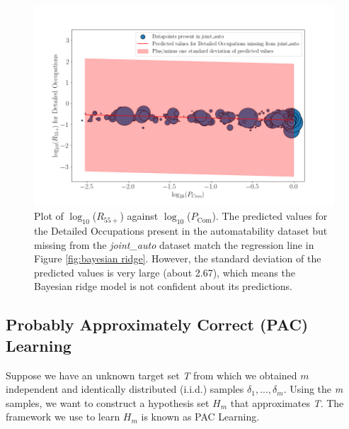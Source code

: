 \documentclass[11pt]{article}
\begin{document}
\begin{figure}[!htb]
	\centering
	\includegraphics[width=15cm]{Figures/Bayesian predicted2.png}
	\caption{Plot of $\log_{10}$($R_{55+}$) against $\log_{10}$($P_{\text{Com}}$). The predicted values for the Detailed Occupations present in the automatability dataset but missing from the \emph{joint\_auto} dataset match the regression line in Figure \ref{fig:bayesian ridge}. However, the standard deviation of the predicted values is very large (about 2.67), which means the Bayesian ridge model is not confident about its predictions.}
	\label{fig:baysian predicted}
\end{figure}



\subsection{Probably Approximately Correct (PAC) Learning}
\label{subsec:PAC}
Suppose we have an unknown target set \emph{T} from which we obtained $m$ independent and identically distributed (i.i.d.) samples $\delta_{1},...,\delta_{m}$. Using the \emph{m} samples, we want to construct a hypothesis set $H_{m}$ that approximates \emph{T}. The framework we use to learn $H_{m}$ is known as PAC Learning.
\end{document}
